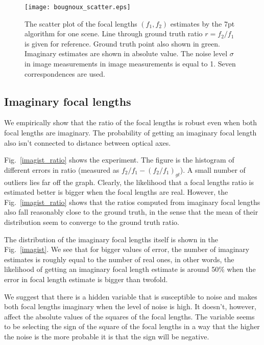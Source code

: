 \begin{figure}[h!]
  \begin{center}
    \texttt{[image: bougnoux\_scatter.eps]}
    \caption[Scattered focal length estimates]{The scatter plot of the focal lengths $(f_1, f_2)$ estimates by the 7pt algorithm for one scene. Line through ground truth ratio $r = f_2\slash f_1$ is given for reference. Ground truth point also shown in green. Imaginary estimates are shown in absolute value. The noise level $\sigma$ in image measurements in image measurements is equal to 1. Seven correspondences are used.}
    \label{scatter}
  \end{center}
\end{figure}

\subsection{Imaginary focal lengths}
\label{sec:Imaginary}
We empirically show that the ratio of the focal lengths is robust even when both focal lengths are imaginary.
The probability of getting an imaginary focal length also  isn't connected to distance between optical axes. 

Fig.~\ref{imagist_ratio} shows the experiment. The figure is the histogram of different errors in ratio (measured as $f_2\slash f_1-(f_2/f_1)_{gt}$).  A small number of outliers lies far off the graph.
Clearly, the likelihood that a focal lengths ratio is estimated better is bigger when the focal lengths are real. However, the Fig.~\ref{imagist_ratio} shows that the ratios  computed from imaginary focal lengths also fall reasonably close to the ground truth, in the sense that the mean of their distribution seem to converge to the ground truth ratio.

The distribution of the imaginary focal lengths itself is shown in the Fig.~\ref{imagist}. We see that for bigger values of error, the number of imaginary estimates is roughly equal to the number of real ones, in other words, the likelihood of getting an imaginary focal length estimate is around 50$\%$ when the error in focal length estimate is bigger than twofold. 

 We suggest that there is a hidden variable that is susceptible to noise and makes both focal lengths imaginary when the level of noise is high. It doesn't, however, affect the absolute values of the squares of the focal lengths. The variable seems to be selecting the sign of the square of the focal lengths in a way that the higher the noise is the more probable it is that the sign will be negative. 


